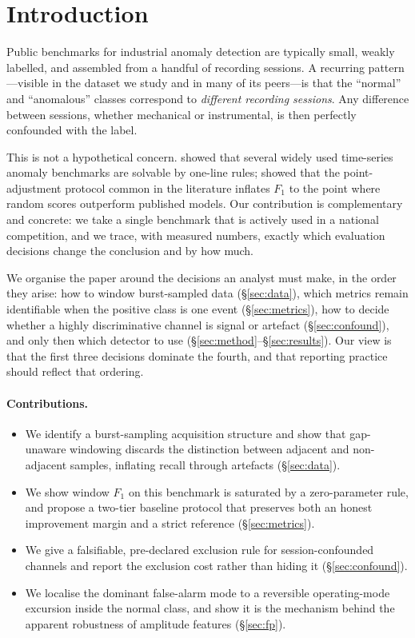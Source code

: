 \documentclass[twocolumn,10pt]{article}
\begin{document}
\section{Introduction}

Public benchmarks for industrial anomaly detection are typically small, weakly
labelled, and assembled from a handful of recording sessions. A recurring
pattern---visible in the dataset we study and in many of its peers---is that
the ``normal'' and ``anomalous'' classes correspond to \emph{different
recording sessions}. Any difference between sessions, whether mechanical or
instrumental, is then perfectly confounded with the label.

This is not a hypothetical concern. \citet{wu2021flawed} showed that several
widely used time-series anomaly benchmarks are solvable by one-line rules;
\citet{kim2022rigorous} showed that the point-adjustment protocol common in the
literature inflates $F_1$ to the point where random scores outperform published
models. Our contribution is complementary and concrete: we take a single
benchmark that is actively used in a national competition, and we trace, with
measured numbers, exactly which evaluation decisions change the conclusion and
by how much.

We organise the paper around the decisions an analyst must make, in the order
they arise: how to window burst-sampled data (\S\ref{sec:data}), which metrics
remain identifiable when the positive class is one event (\S\ref{sec:metrics}),
how to decide whether a highly discriminative channel is signal or artefact
(\S\ref{sec:confound}), and only then which detector to use
(\S\ref{sec:method}--\S\ref{sec:results}). Our view is that the first three
decisions dominate the fourth, and that reporting practice should reflect that
ordering.

\paragraph{Contributions.}
\begin{itemize}\itemsep1pt
\item We identify a burst-sampling acquisition structure and show that
gap-unaware windowing discards the distinction between adjacent and
non-adjacent samples, inflating recall through artefacts (\S\ref{sec:data}).
\item We show window $F_1$ on this benchmark is saturated by a zero-parameter
rule, and propose a two-tier baseline protocol that preserves both an honest
improvement margin and a strict reference (\S\ref{sec:metrics}).
\item We give a falsifiable, pre-declared exclusion rule for session-confounded
channels and report the exclusion cost rather than hiding it
(\S\ref{sec:confound}).
\item We localise the dominant false-alarm mode to a reversible operating-mode
excursion inside the normal class, and show it is the mechanism behind the
apparent robustness of amplitude features (\S\ref{sec:fp}).
\end{itemize}
\end{document}
